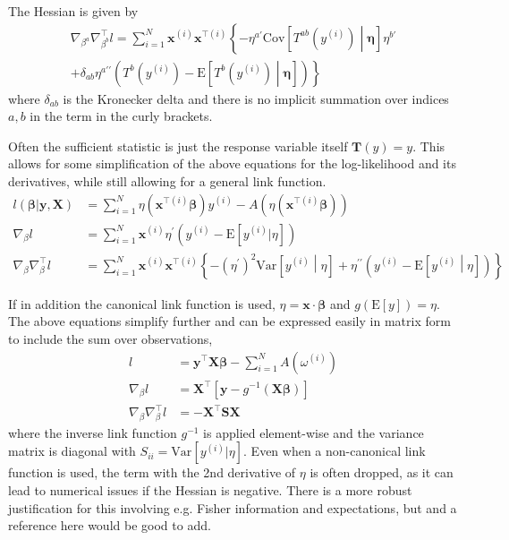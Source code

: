 \documentclass{article}
\newcommand{\bbeta}{\boldsymbol{\beta}}
\begin{document}
The Hessian is given by
\begin{multline}
	\nabla_{\beta^a} \nabla^\intercal_{\beta^b} l = \sum_{i=1}^N \mathbf{x}^{(i)}
	\mathbf{x}^{\intercal(i)} \left\{ - \eta^{a \prime}
	\textrm{Cov}\left[T^{ab}(y^{(i)}) \middle| \boldsymbol{\eta}\right] \eta^{b \prime} \right. \\
  + \left. \delta_{ab} \eta^{a\prime\prime}\left( T^b (y^{(i)}) -
	\textrm{E}\left[T^b(y^{(i)}) \middle| \boldsymbol{\eta} \right] \right) \right\}
\end{multline}
where \(\delta_{ab}\) is the Kronecker delta and there is no implicit
summation over indices \(a, b\) in the term in the curly brackets.

Often the sufficient statistic is just the response variable itself
\(\mathbf{T}(y) = y\). This allows for some simplification of the above
equations for the log-likelihood and its derivatives, while still allowing for a
general link function.
\begin{align}
	l(\bbeta | \mathbf{y}, \mathbf{X})        & = \sum_{i=1}^N
	\eta(\mathbf{x}^{\intercal(i)} \bbeta) y^{(i)} -
	A\left(\eta(\mathbf{x}^{\intercal(i)} \bbeta) \right)                                                      \\
	\nabla_{\beta} l                          & = \sum_{i=1}^N \mathbf{x}^{(i)} \eta^{\prime} \left( y^{(i)} -
	\textrm{E}[y^{(i)}|\eta] \right)                                                                           \\
	\nabla_{\beta} \nabla^\intercal_{\beta} l & = \sum_{i=1}^N \mathbf{x}^{(i)}
	\mathbf{x}^{\intercal(i)} \left\{ - (\eta^{\prime})^2 \textrm{Var}\left[y^{(i)}
		\middle| \eta\right] + \eta^{\prime\prime}\left( y^{(i)} -
	\textrm{E}\left[y^{(i)} \middle| \eta \right] \right) \right\}
\end{align}

If in addition the canonical link function is used, \(\eta = \mathbf{x} \cdot
\bbeta\) and \(g(\textrm{E}[y]) = \eta\). The above equations
simplify further and can be expressed easily in matrix form to include the sum
over observations,
\begin{align}
	l                                     & = \mathbf{y}^\intercal \mathbf{X} \bbeta - \sum_{i=1}^N
	A\left(\omega^{(i)} \right)                                                                                        \\
	\nabla_\beta l                        & = \mathbf{X}^\intercal \left[ \mathbf{y} - g^{-1}(\mathbf{X}\bbeta)\right] \\
	\nabla_\beta \nabla_\beta^\intercal l & = - \mathbf{X}^\intercal \mathbf{S} \mathbf{X}
\end{align}
where the inverse link function \(g^{-1}\) is applied element-wise and the
variance matrix is diagonal with \(S_{ii} = \textrm{Var}[y^{(i)}|\eta]\). Even
when a non-canonical link function is used, the term with the 2nd derivative of
\(\eta\) is often dropped, as it can lead to numerical issues if the Hessian is
negative. There is a more robust justification for this involving e.g. Fisher
information and expectations, but and a reference here would be good to add.
\end{document}
